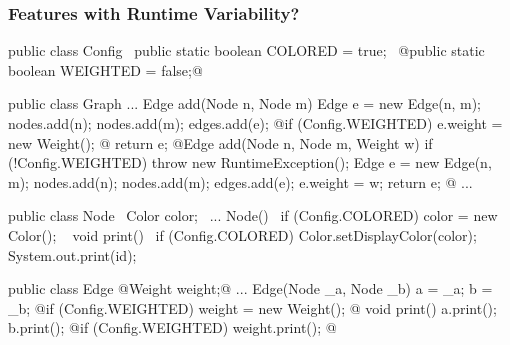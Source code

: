\subsubsection{Features with Runtime Variability?}
\begin{frame}[fragile]{\myframetitle}
	\footnotesize
	\begin{mycolumns}[animation=none]
\begin{codetight}{}
public class Config {
	~public static boolean COLORED = true;~
	@public static boolean WEIGHTED = false;@
}
\end{codetight}
\begin{codetight}{}
public class Graph {
	...
	Edge add(Node n, Node m) {
		Edge e = new Edge(n, m);
		nodes.add(n); nodes.add(m); edges.add(e);
		@if (Config.WEIGHTED) { e.weight = new Weight(); }@
		return e;
	}
	@Edge add(Node n, Node m, Weight w) {
		if (!Config.WEIGHTED) { throw new RuntimeException(); }
		Edge e = new Edge(n, m);
		nodes.add(n); nodes.add(m); edges.add(e);
		e.weight = w;
		return e;
	}@
	...
}
\end{codetight}
	\mynextcolumn
\begin{codetight}{}
public class Node {
	~Color color;~
	...
	Node(){
		~if (Config.COLORED) { color = new Color(); }~
	}
	void print() {
		~if (Config.COLORED) { Color.setDisplayColor(color); }~
		System.out.print(id);
	}
}
\end{codetight}
\begin{codetight}{}
public class Edge {
	@Weight weight;@
	...
	Edge(Node _a, Node _b) {
		a = _a; b = _b;
		@if (Config.WEIGHTED) { weight = new Weight(); }@
	}
	void print() {
		a.print(); b.print();
		@if (Config.WEIGHTED) { weight.print(); }@
	}
}
\end{codetight}
	\end{mycolumns}
\end{frame}

